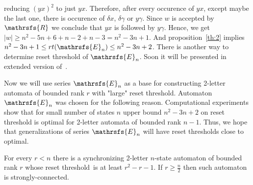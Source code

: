 \documentclass[11pt]{llncs}
\newcommand{\rl}{reset threshold}
\newcommand{\R}{\mathrsfs{R}}
\newcommand{\g}{\gamma}
\newcommand{\dl}{\delta}
\newcommand{\rt}{rt}
\newcommand{\rtc}{rt_{c}}
\begin{document}
reducing $(yx)^2$ to just $yx$. Therefore, after every occurence of $yx$, except maybe the last one, there is occurence 
of $\dl x$, $\dl \g$ or $y \g$. Since $w$ is accepted by $\R$ we conclude that $yx$ is followed by $y\g$.
Hence, we get $|w| \geq n^2 - 5n + 6 + n - 2 + n - 3 = n^2 -3n + 1$.
And proposition~\ref{th:2} implies $n^2 -3n + 1 \leq \rt(\mathrsfs{E}_n) \leq n^2 -3n + 2$. 
There is another way to determine reset threshold of $\mathrsfs{E}_n$. Soon it will be presented in
extended version of~\cite{AGV}.

Now we will use series $\mathrsfs{E}_n$ as a base for constructing 2-letter automata of bounded
rank $r$ with "large" reset threshold. Automaton $\mathrsfs{E}_n$ was chosen for the following reason.
Computational experiments show that for small number of states $n$ upper bound $n^2 -3n +2$ on reset threshold is optimal
for 2-letter automata of bounded rank $n - 1$.
Thus, we hope that generalizations of series $\mathrsfs{E}_n$ will have reset thresholds close to optimal.

\begin{proposition}
For every $r < n$ there is a synchronizing 2-letter $n$-state automaton of bounded rank $r$ whose \rl\ is at least 
$r^2 -r - 1$. If $r \geq \frac{n}{2}$ then such automaton is strongly-connected.
\end{proposition}
\end{document}
